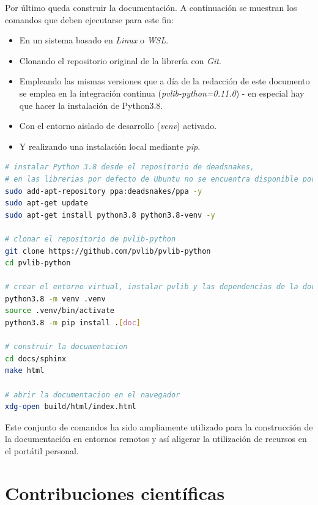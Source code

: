 Por último queda construir la documentación. A continuación se muestran los comandos que deben ejecutarse para este fin:

\begin{itemize}
    \item En un sistema basado en \textit{Linux} o \textit{WSL}.
    \item Clonando el repositorio original de la librería con \textit{Git}.
    \item Empleando las mismas versiones que a día de la redacción de este documento se emplea en la integración continua (\textit{pvlib-python=0.11.0}) - en especial hay que hacer la instalación de Python3.8.
    \item Con el entorno aislado de desarrollo (\textit{venv}) activado.
    \item Y realizando una instalación local mediante \textit{pip}.
\end{itemize}

\begin{lstlisting}[language=bash, caption={Comandos para construir la documentación de \textit{pvlib-python}.}, label={lst:doc_build}]
# instalar Python 3.8 desde el repositorio de deadsnakes,
# en las librerias por defecto de Ubuntu no se encuentra disponible por antiguedad
sudo add-apt-repository ppa:deadsnakes/ppa -y
sudo apt-get update
sudo apt-get install python3.8 python3.8-venv -y

# clonar el repositorio de pvlib-python
git clone https://github.com/pvlib/pvlib-python
cd pvlib-python

# crear el entorno virtual, instalar pvlib y las dependencias de la documentacion
python3.8 -m venv .venv
source .venv/bin/activate
python3.8 -m pip install .[doc]

# construir la documentacion
cd docs/sphinx
make html

# abrir la documentacion en el navegador
xdg-open build/html/index.html
\end{lstlisting}

Este conjunto de comandos ha sido ampliamente utilizado para la construcción de la documentación en entornos remotos y así aligerar la utilización de recursos en el portátil personal.

\section{Contribuciones científicas} \label{sct:desarrollo:contribuciones_cientificas}

